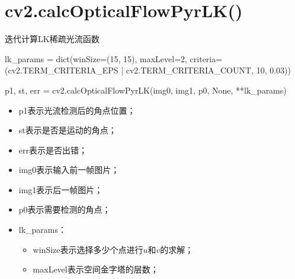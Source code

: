 \documentclass[AutoFakeBold]{MyFormat}
\begin{document}
\section{cv2.calcOpticalFlowPyrLK()}
\par 迭代计算LK稀疏光流函数
\par lk\_params = dict(winSize=(15, 15),
maxLevel=2,
criteria=(cv2.TERM\_CRITERIA\_EPS | cv2.TERM\_CRITERIA\_COUNT, 10, 0.03))
\par p1, st, err = cv2.calcOpticalFlowPyrLK(img0, img1, p0, None,
**lk\_params)
\begin{itemize}
    \item p1表示光流检测后的角点位置；
    \item st表示是否是运动的角点；
    \item err表示是否出错；
    \item img0表示输入前一帧图片；
    \item img1表示后一帧图片；
    \item p0表示需要检测的角点；
    \item lk\_params：
    \begin{itemize}
        \item winSize表示选择多少个点进行$u$和$v$的求解；
        \item maxLevel表示空间金字塔的层数；
    \end{itemize}
\end{itemize}
\end{document}
